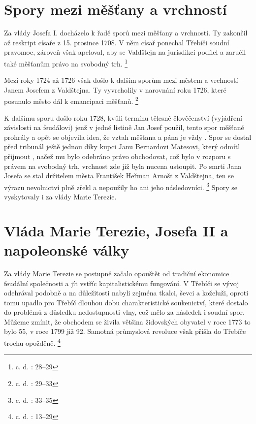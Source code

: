 \documentclass[a4paper,oneside,12p]{report}
\begin{document}
\section{Spory mezi měšťany a vrchností}

Za vlády Josefa I. docházelo k řadě sporů mezi měšťany a vrchností.
Ty zakončil až reskript císaře z 15. prosince 1708.
V něm císař ponechal Třebíči soudní pravomoc, zároveň však apeloval, aby se Valdštejn na jurisdikci podílel a zaručil také měšťanům právo na svobodný trh. \footnote{c. d. : 28--29}

Mezi roky 1724 až 1726 však došlo k dalším sporům mezi městem a vrchností -- Janem Josefem z Valdštejna.
Ty vyvrcholily v narovnání roku 1726, které posunulo město dál k emancipaci měšťanů. \footnote{c. d. : 29--33}

K dalšímu sporu došlo roku 1728, kvůli termínu tělesné člověčenství (vyjádření závislosti na feudálovi) jenž v jedné listině Jan Josef použil, tento spor měšťané prohrály a opět se objevila idea, že vztah měšťana a pána je vždy .
Spor se dostal před tribunál ještě jednou díky kupci Janu Bernardovi Matesovi, který odmítl přijmout , načež mu bylo odebráno právo obchodovat, což bylo v rozporu s právem na svobodný trh, vrchnost zde již byla nucena ustoupit.
Po smrti Jana Josefa se stal držitelem města František Heřman Arnošt z Valdštejna, ten se výrazu nevolnictví plně zřekl a nepoužily ho ani jeho následovníci. \footnote{c. d. : 33--35}
Spory se vyskytovaly i za vlády Marie Terezie.

\section{Vláda Marie Terezie, Josefa II a napoleonské války}

Za vlády Marie Terezie se postupně začalo opouštět od tradiční ekonomice feudální společnosti a jít vstříc kapitalistickému fungování.
V Třebíči se vývoj odehrával podobně a na důležitosti nabyli zejména tkalci, ševci a koželuži, oproti tomu upadlo pro Třebíč dlouhou dobu charakteristické soukenictví, které dostalo do problémů z důsledku nedostupnosti vlny, což mělo za následek i soudní spor.
Můžeme zmínit, že obchodem se živila většina židovských obyvatel v roce 1773 to bylo 55, v roce 1799 již 92.
Samotná průmyslová revoluce však přišla do Třebíče trochu opožděně. \footnote{c. d. : 13--29}
\end{document}
